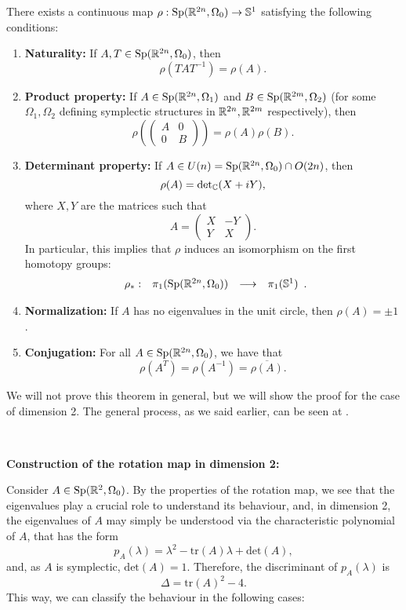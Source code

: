 \begin{theo}
There exists a continuous map $\rho : \text{Sp}(\mathbb{R}^{2n},\Omega_0) \rightarrow \mathbb{S}^1$ satisfying the following conditions:
\begin{enumerate}
	\item {\bf Naturality:} If $A,T \in \text{Sp}(\mathbb{R}^{2n},\Omega_0)$, then
	\[\rho(TAT^{-1}) = \rho(A) .\]
	\item {\bf Product property:} If $A \in \text{Sp}(\mathbb{R}^{2n},\Omega_1)$ and $B \in \text{Sp}(\mathbb{R}^{2m},\Omega_2)$ (for some $\Omega_1, \Omega_2$ defining symplectic structures in $\mathbb{R}^{2n}, \mathbb{R}^{2m}$ respectively), then
	\[\rho\left(\begin{pmatrix}A & 0 \\ 0 & B\end{pmatrix}\right) = \rho(A) \rho(B) .\]
	\item {\bf Determinant property:} If $A \in U(n) = \text{Sp}(\mathbb{R}^ {2n},\Omega_0) \cap O(2n)$, then
	\[\rho(A) = \text{det}_{\mathbb{C}}(X+iY),\]
	where $X,Y$ are the matrices such that
	\[A = \begin{pmatrix} X & -Y \\ Y & X \end{pmatrix}.\]
	In particular, this implies that $\rho$ induces an isomorphism on the first homotopy groups:
	\[\begin{array}{rccc} \rho_{\ast} : & \pi_1(\text{Sp}(\mathbb{R}^{2n},\Omega_0)) & \longrightarrow & \pi_1(\mathbb{S}^1) \end{array} .\]
	\item {\bf Normalization:} If $A$ has no eigenvalues in the unit circle, then $\rho(A) = \pm 1$.
	\item {\bf Conjugation:} For all $A \in \text{Sp}(\mathbb{R}^{2n},\Omega_0)$, we have that
	\[\rho(A^T) = \rho(A^{-1}) = \overline{\rho(A)} .\]
\end{enumerate}

\end{theo}

We will not prove this theorem in general, but we will show the proof for the case of dimension 2. The general process, as we said earlier, can be seen at \cite{gutt2012conley}.

\

{\bf Construction of the rotation map in dimension 2:}

Consider $A \in \text{Sp}(\mathbb{R}^2,\Omega_0)$. By the properties of the rotation map, we see that the eigenvalues play a crucial role to understand its behaviour, and, in dimension 2, the eigenvalues of $A$ may simply be understood via the characteristic polynomial of $A$, that has the form
\[p_A(\lambda) = \lambda^2 - \text{tr}(A) \lambda + \text{det}(A) ,\]
and, as $A$ is symplectic, $\text{det}(A) = 1$. Therefore, the discriminant of $p_A(\lambda)$ is
\[\Delta = \text{tr}(A)^2 - 4 .\]
This way, we can classify the behaviour in the following cases:

